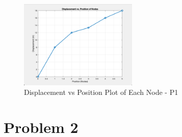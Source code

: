 \documentclass[8pt]{article}
\begin{document}
\begin{figure}[h!]
    \centering
    \includegraphics[width=0.5\textwidth]{../../assets/Q1_Graph}
    \caption{Displacement vs Position Plot of Each Node - P1}
    \label{fig:P1_out}
\end{figure}
\break

\section{Problem 2}
\end{document}
